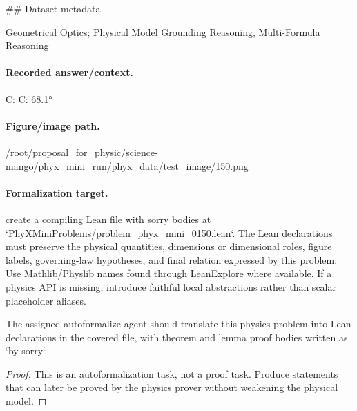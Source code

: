 \#\# Dataset metadata

Geometrical Optics; Physical Model Grounding Reasoning, Multi-Formula Reasoning

\paragraph{Recorded answer/context.}
C: C: 68.1°

\paragraph{Figure/image path.}
/root/proposal\_for\_physic/science-mango/phyx\_mini\_run/phyx\_data/test\_image/150.png

\paragraph{Formalization target.}
create a compiling Lean file with sorry bodies at `PhyXMiniProblems/problem\_phyx\_mini\_0150.lean`. The Lean declarations must preserve the physical quantities, dimensions or dimensional roles, figure labels, governing-law hypotheses, and final relation expressed by this problem.
Use Mathlib/Physlib names found through LeanExplore where available. If a physics API is missing, introduce faithful local abstractions rather than scalar placeholder aliases.

\begin{theorem}
\label{thm:physics:phyx_mini_0150:target}
The assigned autoformalize agent should translate this physics problem into Lean declarations in the covered file, with theorem and lemma proof bodies written as `by sorry`.
\end{theorem}
\begin{proof}
This is an autoformalization task, not a proof task. Produce statements that can later be proved by the physics prover without weakening the physical model.
\end{proof}

